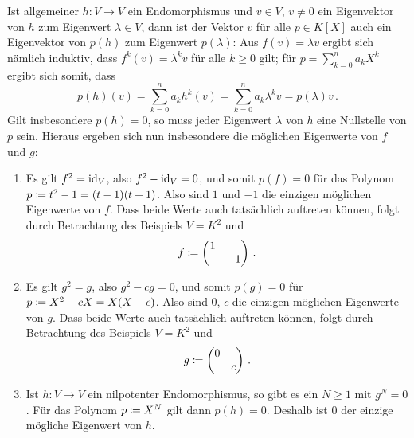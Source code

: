 \section{}





\subsection{}

Ist allgemeiner $h \colon V \to V$ ein Endomorphismus und $v \in V$, $v \neq 0$ ein Eigenvektor von $h$ zum Eigenwert $\lambda \in V$, dann ist der Vektor $v$ für alle $p \in K[X]$ auch ein Eigenvektor von $p(h)$ zum Eigenwert $p(\lambda)$:
Aus $f(v) = \lambda v$ ergibt sich nämlich induktiv, dass $f^k(v) = \lambda^k v$ für alle $k \geq 0$ gilt;
für $p = \sum_{k=0}^n a_k X^k$ ergibt sich somit, dass
\[
    p(h)(v)
  = \sum_{k=0}^n a_k h^k(v)
  = \sum_{k=0}^n a_k \lambda^k v
  = p(\lambda) v \,.
\]
Gilt insbesondere $p(h) = 0$, so muss jeder Eigenwert $\lambda$ von $h$ eine Nullstelle von $p$ sein. 
Hieraus ergeben sich nun insbesondere die möglichen Eigenwerte von $f$ und $g$:

\begin{example}
  \leavevmode
  \begin{enumerate}
    \item
      Es gilt $f^2 = \operatorname{id}_V$, also $f^2 - \operatorname{id}_V = 0$, und somit $p(f) = 0$ für das Polynom $p \coloneqq t^2 - 1 = (t-1)(t+1)$.
      Also sind $1$ und $-1$ die einzigen möglichen Eigenwerte von $f$.
      Dass beide Werte auch tatsächlich auftreten können, folgt durch Betrachtung des Beispiels $V = K^2$ und
      \[
                  f
        \coloneqq  \begin{pmatrix}
                    1 &     \\
                      & -1
                  \end{pmatrix} \,.
      \]
    \item
      Es gilt $g^2 = g$, also $g^2 - cg = 0$, und somit $p(g) = 0$ für $p \coloneqq X^2 - cX = X(X-c)$.
      Also sind $0$, $c$ die einzigen möglichen Eigenwerte von $g$.
      Dass beide Werte auch tatsächlich auftreten können, folgt durch Betrachtung des Beispiels $V = K^2$ und
      \[
                  g
        \coloneqq  \begin{pmatrix}
                    0 &   \\
                      & c
                  \end{pmatrix} \,.
      \]
    \item
      Ist $h \colon V \to V$ ein nilpotenter Endomorphismus, so gibt es ein $N \geq 1$ mit $g^N = 0$.
      Für das Polynom $p \coloneqq X^N$ gilt dann $p(h) = 0$.
      Deshalb ist $0$ der einzige mögliche Eigenwert von $h$.
  \end{enumerate}
\end{example}





